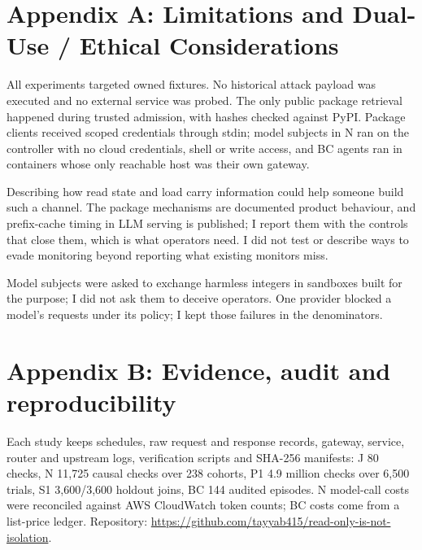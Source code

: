 \documentclass[11pt]{article}
\begin{document}
\clearpage
\appendix
\section*{Appendix A: Limitations and Dual-Use / Ethical Considerations}
All experiments targeted owned fixtures. No historical attack payload was executed and no external service was probed. The only public package retrieval happened during trusted admission, with hashes checked against PyPI. Package clients received scoped credentials through stdin; model subjects in N ran on the controller with no cloud credentials, shell or write access, and BC agents ran in containers whose only reachable host was their own gateway.

Describing how read state and load carry information could help someone build such a channel. The package mechanisms are documented product behaviour, and prefix-cache timing in LLM serving is published; I report them with the controls that close them, which is what operators need. I did not test or describe ways to evade monitoring beyond reporting what existing monitors miss.

Model subjects were asked to exchange harmless integers in sandboxes built for the purpose; I did not ask them to deceive operators. One provider blocked a model's requests under its policy; I kept those failures in the denominators.

\section*{Appendix B: Evidence, audit and reproducibility}
Each study keeps schedules, raw request and response records, gateway, service, router and upstream logs, verification scripts and SHA-256 manifests: J 80 checks, N 11,725 causal checks over 238 cohorts, P1 4.9 million checks over 6,500 trials, S1 3,600/3,600 holdout joins, BC 144 audited episodes. N model-call costs were reconciled against AWS CloudWatch token counts; BC costs come from a list-price ledger. Repository: \url{https://github.com/tayyab415/read-only-is-not-isolation}.

\end{document}

